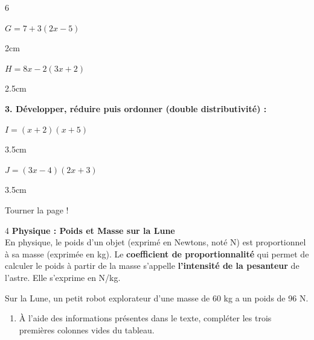 \documentclass[a4paper]{book}
\begin{document}
{\begin{exerciceNote}{6}
        \noindent
        \begin{minipage}{0.48\textwidth}
            $G = 7 + 3(2x - 5)$
            \begin{ZoneReponse}{2cm}
            \end{ZoneReponse}
        \end{minipage}\hfill
        \begin{minipage}{0.48\textwidth}
            $H = 8x - 2(3x + 2)$
            \begin{ZoneReponse}{2.5cm}
            \end{ZoneReponse}
        \end{minipage}
    
        \medskip
        \textbf{3. Développer, réduire puis ordonner (double distributivité) :}
        
        \noindent
        \begin{minipage}{0.48\textwidth}
            $I = (x + 2)(x + 5)$
            \begin{ZoneReponse}{3.5cm}
            \end{ZoneReponse}
        \end{minipage}\hfill
        \begin{minipage}{0.48\textwidth}
            $J = (3x - 4)(2x + 3)$
            \begin{ZoneReponse}{3.5cm}
            \end{ZoneReponse}
        \end{minipage}
    \end{exerciceNote}

    \vfill  \hfill Tourner la page !
    
\newpage
    
    \begin{exerciceNote}{4}
        \textbf{Physique : Poids et Masse sur la Lune} \\
        En physique, le poids d'un objet (exprimé en Newtons, noté N) est proportionnel à sa masse (exprimée en kg). Le \textbf{coefficient de proportionnalité} qui permet de calculer le poids à partir de la masse s'appelle \textbf{l'intensité de la pesanteur} de l'astre. Elle s'exprime en N/kg.
        
        \smallskip
        Sur la Lune, un petit robot explorateur d'une masse de 60 kg a un poids de 96 N.
            
        \begin{enumerate}
            \item À l'aide des informations présentes dans le texte, compléter les trois premières colonnes vides du tableau.


\end{enumerate}
\end{exerciceNote}}
\end{document}

